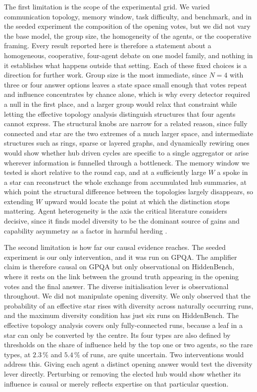 The first limitation is the scope of the experimental grid. We varied
communication topology, memory window, task difficulty, and benchmark, and in the
seeded experiment the composition of the opening votes, but we did not vary the
base model, the group size, the homogeneity of the agents, or the cooperative
framing. Every result reported here is therefore a statement about a homogeneous,
cooperative, four-agent debate on one model family, and nothing in it establishes
what happens outside that setting. Each of these fixed choices is a direction for
further work. Group size is the most immediate, since $N = 4$ with three or four
answer options leaves a state space small enough that votes repeat and influence
concentrates by chance alone, which is why every detector required a null in the
first place, and a larger group would relax that constraint while letting the
effective topology analysis distinguish structures that four agents cannot
express. The structural knobs are narrow for a related reason, since fully
connected and star are the two extremes of a much larger space, and intermediate
structures such as rings, sparse or layered graphs, and dynamically rewiring ones
would show whether hub driven cycles are specific to a single aggregator or arise
wherever information is funnelled through a bottleneck. The memory window we
tested is short relative to the round cap, and at a sufficiently large $W$ a
spoke in a star can reconstruct the whole exchange from accumulated hub
summaries, at which point the structural difference between the topologies
largely disappears, so extending $W$ upward would locate the point at which the
distinction stops mattering. Agent heterogeneity is the axis the critical
literature considers decisive, since it finds model diversity to be the dominant
source of gains
\citep{liu2025stopovervaluing, chen2024reconcile} and capability asymmetry as a
factor in harmful herding \citep{wynn2025talk}.

The second limitation is how far our causal evidence reaches. The seeded
experiment is our only intervention, and it was run on GPQA. The amplifier claim
is therefore causal on GPQA but only observational on HiddenBench, where it rests
on the link between the ground truth appearing in the opening votes and the final
answer. The diverse initialisation lever is observational throughout. We did not
manipulate opening diversity. We only observed that the probability of an
effective star rises with diversity across naturally occurring runs, and the
maximum diversity condition has just six runs on HiddenBench. The effective
topology analysis covers only fully-connected runs, because a leaf in a star can
only be converted by the centre. Its four types are also defined by thresholds on
the share of influence held by the top one or two agents, so the rare types, at
$2.3\,\%$ and $5.4\,\%$ of runs, are quite uncertain.
Two interventions would address this. Giving each agent a distinct opening answer
would test the diversity lever directly. Perturbing or removing the elected hub
would show whether its influence is causal or merely reflects expertise on that
particular question.

